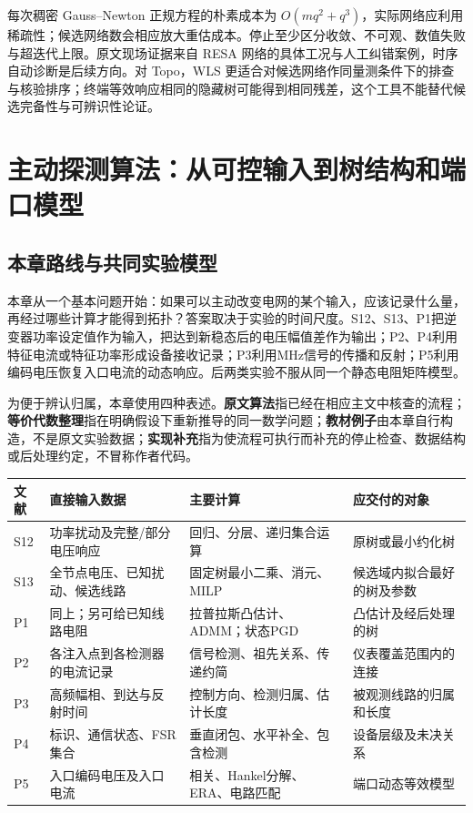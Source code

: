 \documentclass[UTF8,11pt,fontset=fandol,openany,oneside]{ctexbook}
\theoremstyle{definition}
\theoremstyle{remark}
\numberwithin{equation}{chapter}
\begin{document}
每次稠密 Gauss--Newton 正规方程的朴素成本为 $O(mq^2+q^3)$，实际网络应利用稀疏性；候选网络数会相应放大重估成本。停止至少区分收敛、不可观、数值失败与超迭代上限。原文现场证据来自 RESA 网络的具体工况与人工纠错案例，时序自动诊断是后续方向。对 Topo，WLS 更适合对候选网络作同量测条件下的排查与核验排序；终端等效响应相同的隐藏树可能得到相同残差，这个工具不能替代候选完备性与可辨识性论证。




\chapter{主动探测算法：从可控输入到树结构和端口模型}
\label{ch:probing}

\section{本章路线与共同实验模型}

本章从一个基本问题开始：如果可以主动改变电网的某个输入，应该记录什么量，再经过哪些计算才能得到拓扑？答案取决于实验的时间尺度。S12、S13、P1把逆变器功率设定值作为输入，把达到新稳态后的电压幅值差作为输出；P2、P4利用特征电流或特征功率形成设备接收记录；P3利用MHz信号的传播和反射；P5利用编码电压恢复入口电流的动态响应。后两类实验不服从同一个静态电阻矩阵模型。

为便于辨认归属，本章使用四种表述。\textbf{原文算法}指已经在相应主文中核查的流程；\textbf{等价代数整理}指在明确假设下重新推导的同一数学问题；\textbf{教材例子}由本章自行构造，不是原文实验数据；\textbf{实现补充}指为使流程可执行而补充的停止检查、数据结构或后处理约定，不冒称作者代码。

\begin{center}
\small
\begin{tabularx}{\textwidth}{@{}lXXX@{}}
\toprule
文献 & 直接输入数据 & 主要计算 & 应交付的对象\\
\midrule
S12 & 功率扰动及完整/部分电压响应 & 回归、分层、递归集合运算 & 原树或最小约化树\\
S13 & 全节点电压、已知扰动、候选线路 & 固定树最小二乘、消元、MILP & 候选域内拟合最好的树及参数\\
P1 & 同上；另可给已知线路电阻 & 拉普拉斯凸估计、ADMM；状态PGD & 凸估计及经后处理的树\\
P2 & 各注入点到各检测器的电流记录 & 信号检测、祖先关系、传递约简 & 仪表覆盖范围内的连接\\
P3 & 高频幅相、到达与反射时间 & 控制方向、检测归属、估计长度 & 被观测线路的归属和长度\\
P4 & 标识、通信状态、FSR集合 & 垂直闭包、水平补全、包含检测 & 设备层级及未决关系\\
P5 & 入口编码电压及入口电流 & 相关、Hankel分解、ERA、电路匹配 & 端口动态等效模型\\
\bottomrule
\end{tabularx}
\end{center}
\end{document}
